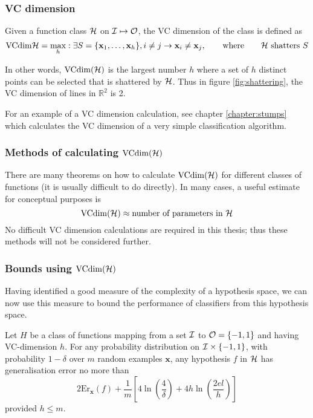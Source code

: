 \subsubsection{VC dimension}

\begin{definition}[VC dimension]
Given a function class $\mathcal{H}$ on $\mathcal{I} \mapsto \mathcal{O}$, the VC
dimension of the class is defined as
%
\begin{equation}
\mathrm{VCdim}{\mathcal{H}} = \max_{h} : \exists S = \{\mathbf{x}_1, \ldots, \mathbf{x}_h\},
i \neq j \rightarrow \mathbf{x}_i \neq \mathbf{x}_j,
\qquad \mbox{where} \qquad \mbox{\ensuremath{\mathcal{H}}\ shatters $S$}
\end{equation}
\end{definition}

In other words, $\mathrm{VCdim}(\mathcal{H})$ is the largest number $h$ where
a set of $h$ distinct points can be selected that is shattered by
$\mathcal{H}$.  Thus in figure \ref{fig:shattering}, the VC dimension of
lines in $\mathbb{R}^2$ is 2.

For an example of a VC dimension calculation, see
chapter \ref{chapter:stumps} which calculates the VC dimension of a
very simple classification algorithm.


\subsubsection{Methods of calculating $\mathrm{VCdim}(\mathcal{H})$}

There are many theorems on how to calculate $\mathrm{VCdim}(\mathcal{H})$ for
different classes of functions (it is usually difficult to do
directly).  In many cases, a useful estimate for conceptual purposes
is
%
\begin{equation}
\mathrm{VCdim}(\mathcal{H}) \approx \mbox{number of parameters in $\mathcal{H}$}
\end{equation}
%
No difficult VC dimension calculations are required in this thesis;
thus these methods will not be considered further.


\subsubsection{Bounds using $\mathrm{VCdim}(\mathcal{H})$}

Having identified a good measure of the complexity of a hypothesis
space, we can now use this measure to bound the performance of
classifiers from this hypothesis space.

\begin{theorem}
Let $H$ be a class of functions mapping from a set $\mathcal{I}$ to $\mathcal{O} =
\{-1, 1\}$ and having VC-dimension $h$.  For any probability
distribution on $\mathcal{I} \times \{-1,1\}$, with probability $1-\delta$
over $m$ random examples $\mathbf{x}$, any hypothesis $f$ in $\mathcal{H}$
has generalisation error no more than
\begin{equation}
2\mathrm{Er}_{\mathbf{x}}(f) + \frac{1}{m} \left[ 4 \ln 
\left( \frac{4}{\delta} \right) + 4 h \ln \left( \frac{2 e l}{h}
\right) \right]
\end{equation}
provided $h \leq m$.
\end{theorem}

